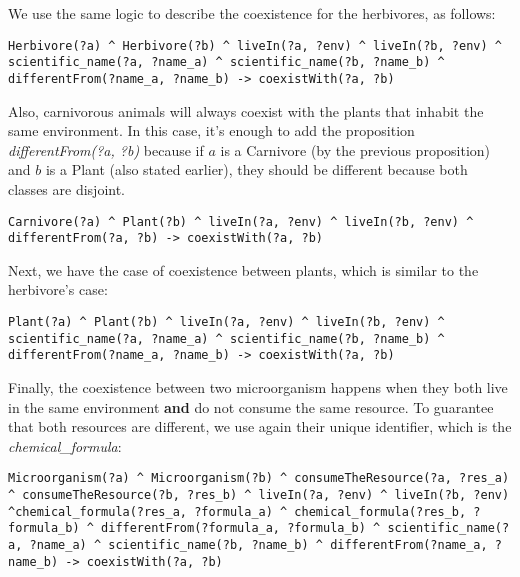 We use the same logic to describe the coexistence for the herbivores, as follows:
\\

\begin{lstlisting}
Herbivore(?a) ^ Herbivore(?b) ^ liveIn(?a, ?env) ^ liveIn(?b, ?env) ^ scientific_name(?a, ?name_a) ^ scientific_name(?b, ?name_b) ^ differentFrom(?name_a, ?name_b) -> coexistWith(?a, ?b)
\end{lstlisting}

Also, carnivorous animals will always coexist with the plants that inhabit the same environment. In this case, it's enough to add the proposition \textit{differentFrom(?a, ?b)} because if $a$ is a Carnivore (by the previous proposition) and $b$ is a Plant (also stated earlier), they should be different because both classes are disjoint.
\\

\begin{lstlisting}
Carnivore(?a) ^ Plant(?b) ^ liveIn(?a, ?env) ^ liveIn(?b, ?env) ^ differentFrom(?a, ?b) -> coexistWith(?a, ?b)
\end{lstlisting}

Next, we have the case of coexistence between plants, which is similar to the herbivore's case:
\\


\begin{lstlisting}
Plant(?a) ^ Plant(?b) ^ liveIn(?a, ?env) ^ liveIn(?b, ?env) ^ scientific_name(?a, ?name_a) ^ scientific_name(?b, ?name_b) ^ differentFrom(?name_a, ?name_b) -> coexistWith(?a, ?b)
\end{lstlisting}

Finally, the coexistence between two microorganism happens when they both live in the same environment \textbf{and} do not consume the same resource. To guarantee that both resources are different, we use again their unique identifier, which is the \textit{chemical\_formula}:
\\

\begin{lstlisting}
Microorganism(?a) ^ Microorganism(?b) ^ consumeTheResource(?a, ?res_a) ^ consumeTheResource(?b, ?res_b) ^ liveIn(?a, ?env) ^ liveIn(?b, ?env) ^chemical_formula(?res_a, ?formula_a) ^ chemical_formula(?res_b, ?formula_b) ^ differentFrom(?formula_a, ?formula_b) ^ scientific_name(?a, ?name_a) ^ scientific_name(?b, ?name_b) ^ differentFrom(?name_a, ?name_b) -> coexistWith(?a, ?b)
\end{lstlisting}

